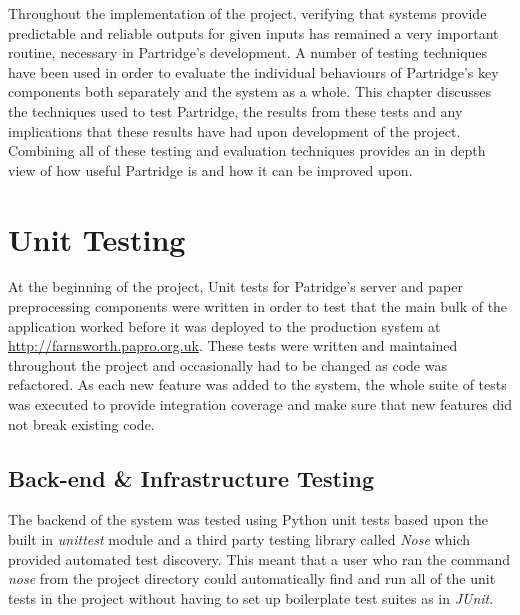 %  
%

Throughout the implementation of the project, verifying that systems provide
predictable and reliable outputs for given inputs has remained a very important
routine, necessary in Partridge's development. A number of testing techniques
have been used in order to evaluate the individual behaviours of Partridge's
key components both separately and the system as a whole. This chapter
discusses the techniques used to test Partridge, the results from these tests
and any implications that these results have had upon development of the
project. Combining all of these testing and evaluation techniques provides an
in depth view of how useful Partridge is and how it can be improved upon.

\section{ Unit Testing }

At the beginning of the project, Unit tests for Patridge's server and paper
preprocessing components were written in order to test that the main bulk of
the application worked before it was deployed to the production system at
\url{http://farnsworth.papro.org.uk}. These tests were written and maintained
throughout the project and occasionally had to be changed as code was
refactored. As each new feature was added to the system, the whole suite of
tests was executed to provide integration coverage and make sure that new
features did not break existing code. 

\subsection{ Back-end \& Infrastructure Testing}

The backend of the system was tested using Python unit tests based upon the
built in \emph{unittest} module and a third party testing library called
\emph{Nose} which provided automated test discovery. This meant that a user who
ran the command \emph{nose} from the project directory could automatically find
and run all of the unit tests in the project without having to set up
boilerplate test suites as in \emph{JUnit}.

